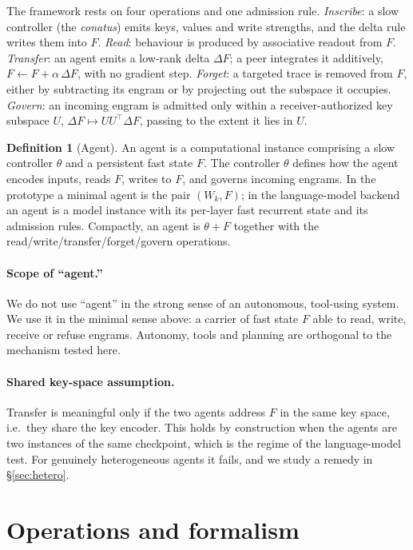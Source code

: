 \documentclass[11pt]{article}
\theoremstyle{definition}
\newtheorem{definition}{Definition}
\newcommand{\F}{F}
\begin{document}
The framework rests on four operations and one admission rule.
\emph{Inscribe}: a slow controller (the \emph{conatus}) emits keys, values and write strengths, and the delta rule writes them into $\F$.
\emph{Read}: behaviour is produced by associative readout from $\F$.
\emph{Transfer}: an agent emits a low-rank delta $\Delta\F$; a peer integrates it additively, $\F \leftarrow \F + \alpha\,\Delta\F$, with no gradient step.
\emph{Forget}: a targeted trace is removed from $\F$, either by subtracting its engram or by projecting out the subspace it occupies.
\emph{Govern}: an incoming engram is admitted only within a receiver-authorized key subspace $U$, $\Delta\F \mapsto U U^\top \Delta\F$, passing to the extent it lies in $U$.

\begin{definition}[Agent]
An agent is a computational instance comprising a slow controller $\theta$ and a persistent fast state $\F$. The controller $\theta$ defines how the agent encodes inputs, reads $\F$, writes to $\F$, and governs incoming engrams. In the prototype a minimal agent is the pair $(W_k,\F)$; in the language-model backend an agent is a model instance with its per-layer fast recurrent state and its admission rules. Compactly, an agent is $\theta + \F$ together with the read/write/transfer/forget/govern operations.
\end{definition}

\paragraph{Scope of ``agent.''}
We do not use ``agent'' in the strong sense of an autonomous, tool-using system. We use it in the minimal sense above: a carrier of fast state $\F$ able to read, write, receive or refuse engrams. Autonomy, tools and planning are orthogonal to the mechanism tested here.

\paragraph{Shared key-space assumption.}
Transfer is meaningful only if the two agents address $\F$ in the same key space, i.e.\ they share the key encoder. This holds by construction when the agents are two instances of the same checkpoint, which is the regime of the language-model test. For genuinely heterogeneous agents it fails, and we study a remedy in \S\ref{sec:hetero}.

\section{Operations and formalism}
\label{sec:method}
\end{document}
